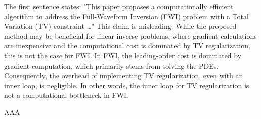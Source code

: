 \begin{point}
	The first sentence states: "This paper proposes a computationally efficient algorithm to address the Full-Waveform Inversion (FWI) problem with a Total Variation (TV) constraint …"
	This claim is misleading. While the proposed method may be beneficial for linear inverse problems, where gradient calculations are inexpensive and the computational cost is dominated by TV regularization, this is not the case for FWI. In FWI, the leading-order cost is dominated by gradient computation, which primarily stems from solving the PDEs. Consequently, the overhead of implementing TV regularization, even with an inner loop, is negligible. In other words, the inner loop for TV regularization is not a computational bottleneck in FWI.
\end{point}

\begin{reply}
AAA

\end{reply}
